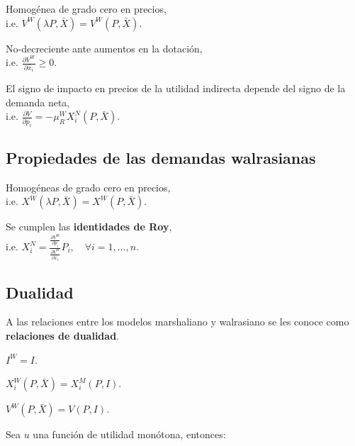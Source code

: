 \documentclass[8pt,a4paper]{extarticle}
\begin{document}
\begin{multicols}{3}
	\begin{eqlist}
		\item Homogénea de grado cero en precios, \\ i.e. $V^W (\lambda P, \bar{X}) = V^W (P, \bar{X})$.
		\item No-decreciente ante aumentos en la dotación, \\ i.e. $\displaystyle \frac{\partial V^W}{\partial \bar{x}_i} \geq 0$.
		\item El signo de impacto en precios de la utilidad indirecta depende del signo de la demanda neta, \\ i.e. $\displaystyle \frac{\partial V}{\partial p_i} = - \mu_R^W X_i^N (P, \bar{X})$.
	\end{eqlist}

	\subsection{Propiedades de las demandas walrasianas}

	\begin{eqlist}
		\item Homogéneas de grado cero en precios, \\ i.e. $X^W (\lambda P, \bar{X}) = X^W (P, \bar{X})$.
		\item Se cumplen las \textbf{identidades de Roy}, \\ i.e. $\displaystyle X^N_i = \frac{\displaystyle \frac{\partial V^W}{\partial p_{i}}}{ \displaystyle \frac{\partial V^W}{\partial \bar{x}_i}} P_i, \quad \forall i = 1, \ldots, n$.
	\end{eqlist}

	\subsection{Dualidad}

	A las relaciones entre los modelos marshaliano y walrasiano se les conoce como \textbf{relaciones de dualidad}.

	\begin{eqlist}
		\item $ \displaystyle I^W = I$.
		\item $X^W_i (P, \bar{X}) = X^M_i (P, I)$.
		\item $V^W(P, \bar{X}) = V(P, I)$.
	\end{eqlist}

	\begin{boxtheo}
		Sea $u$ una función de utilidad monótona, entonces:


\end{boxtheo}
\end{multicols}
\end{document}
